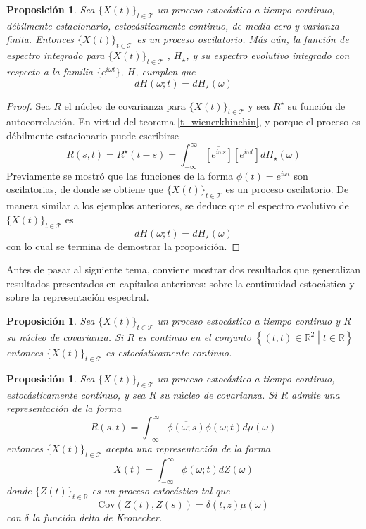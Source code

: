 \documentclass[12pt,letterpaper]{book}
\newtheorem{proposicion}[teorema]{Proposición}
\newcommand{\R}{\mathbb{R}}
\newcommand{\intR}{\int_{-\infty}^{\infty}}
\newcommand{\Cov}[1]{\mathrm{Cov}\left( #1 \right)}
\newcommand{\xt}{$\{X(t)\}_{t\in \mathcal{T}}$ }
\newcommand{\talque}{\mathrel{}\middle|\mathrel{}}
\begin{document}
\begin{proposicion}
Sea \xt un proceso estocástico a tiempo continuo, débilmente estacionario, estocásticamente continuo, de media cero y varianza finita.
%
Entonces \xt es un proceso oscilatorio.
%
Más aún, la función de espectro integrado para \xt, $H_\star$, y su espectro evolutivo integrado con respecto a la familia $\{ e^{i \omega t} \}$, $H$, cumplen que
\begin{equation}
dH(\omega; t) = dH_\star(\omega)
\end{equation}
\label{lazy:redux}
\label{lazy11}
\end{proposicion}

\begin{proof}
Sea $R$ el núcleo de covarianza para \xt y sea $R^\star$ su función de autocorrelación. 
%
En virtud del teorema \ref{t_wienerkhinchin}, y porque el proceso es débilmente estacionario puede escribirse
\begin{equation}
R(s,t) = R^\star({t-s}) 
= \intR  \overline{\left[e^{i \omega {s}}\right]} \left[e^{i \omega {t}}\right]  dH_\star(\omega)
\end{equation}
%
Previamente se mostró que las funciones de la forma $\phi(t) = e^{i \omega t}$ son oscilatorias, de donde se obtiene que \xt es un proceso oscilatorio.
%
De manera similar a los ejemplos anteriores, se deduce que el espectro evolutivo de \xt es
\begin{equation}
dH(\omega; t) = dH_\star(\omega)
\end{equation}
con lo cual se termina de demostrar la proposición.
\end{proof}

Antes de pasar al siguiente tema, conviene mostrar dos resultados que generalizan resultados presentados en capítulos anteriores: sobre la continuidad estocástica y sobre la representación espectral.

\begin{proposicion}
Sea \xt un proceso estocástico a tiempo continuo y $R$ su núcleo de covarianza.
%
Si $R$ es continuo en el conjunto $\left\{ (t,t) \in \R^2 \talque t\in \R \right\}$ entonces \xt es estocásticamente continuo.
\end{proposicion}

\begin{proposicion}
Sea \xt un proceso estocástico a tiempo continuo, estocásticamente continuo,  y sea $R$ su núcleo de covarianza.
%
Si $R$ admite una representación de la forma
\begin{equation}
R(s,t) = \intR \overline{\phi(\omega;s)}\phi(\omega;t) d\mu(\omega)
\end{equation}
entonces \xt acepta una representación de la forma
\begin{equation}
X(t) = \intR \phi(\omega; t) dZ(\omega)
\end{equation}
donde $\{ Z(t) \}_{t\in \R}$ es un proceso estocástico tal que
\begin{equation}
\Cov{Z(t),Z(s)} = \delta(t,z) \mu(\omega)
\end{equation}
con $\delta$ la función delta de Kronecker.
\end{proposicion}
\end{document}
